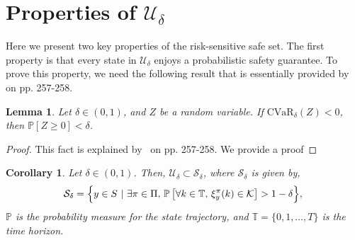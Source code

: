 \documentclass[letterpaper, 10 pt, conference]{ieeeconf}  %
\newtheorem{corollary}{Corollary}
\newtheorem{lemma}{Lemma}
\begin{document}
\section{Properties of $\mathcal{U}_\delta$}
Here we present two key properties of the risk-sensitive safe set.
The first property is that every state in $\mathcal{U}_\delta$ enjoys a probabilistic safety guarantee.
To prove this property, we need the following result that is essentially provided by~\cite{shapiro2009lectures} on pp. 257-258.
\begin{lemma}\label{lemma1}
Let $\delta \in (0,1)$, and $Z$ be a random variable. If $\text{CVaR}_\delta(Z) < 0$, then $\mathbb{P}[Z\geq 0] < \delta$.
\end{lemma}
\begin{proof} This fact is explained by~\cite{shapiro2009lectures} on pp. 257-258. We provide a proof 
\end{proof}
\begin{corollary}
Let $\delta \in (0,1)$. Then, $\mathcal{U}_\delta \subset \mathcal{S}_\delta$, where $\mathcal{S}_\delta$ is given by,
\begin{equation}
\mathcal{S}_\delta = \Big\{y \in S\text{ }|\text{ }\exists \pi \in \Pi\text{, } \mathbb{P}\left[\forall k \in \mathbb{T}\text{, }\xi_y^\pi(k) \in \mathcal{K} \right]  > 1-\delta \Big\}, \\
\label{S}\end{equation}
$\mathbb{P}$ is the probability measure for the state trajectory, and $\mathbb{T} = \{0, 1, \dots, T\}$ is the time horizon.
\end{corollary}
\end{document}
